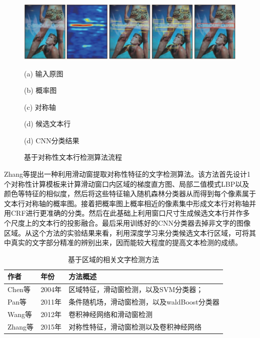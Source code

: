     \begin{figure}[!h]
    \centering
    \includegraphics[width=\textwidth]{./figures/c2_zhang_cnn.jpg}
    \begin{minipage}[t]{0.18\linewidth}
    \centerline{ \small (a) 输入原图}
    \end{minipage}
    \begin{minipage}[t]{0.18\linewidth}
    \centerline{ \small (b) 概率图}
    \end{minipage}
    \begin{minipage}[t]{0.18\linewidth}
    \centerline{ \small (c) 对称轴}
    \end{minipage}
    \begin{minipage}[t]{0.18\linewidth}
    \centerline{ \small (d) 候选文本行}
    \end{minipage}
    \begin{minipage}[t]{0.18\linewidth}
    \centerline{ \small (d) CNN分类结果}
    \end{minipage}
    \caption{基于对称性文本行检测算法流程}
    \label{fig.c2_zhang_cnn}
    \end{figure}

    Zhang等\cite{Zhang2015Symmetry}提出一种利用滑动窗提取对称性特征的文字检测算法。该方法首先设计1个对称性计算模板来计算滑动窗口内区域的梯度直方图、局部二值模式LBP以及颜色等特征的相似度，然后将这些特征输入随机森林分类器从而得到每个像素属于文本行对称轴的概率图。接着把概率图上概率相近的像素集中形成文本行对称轴并用CRF进行更准确的分类。然后在此基础上利用窗口尺寸生成候选文本行并作多个尺度上的文本行的投影融合。最后采用训练好的CNN分类器去掉非文字的图像区域。从这个方法的实验结果来看，利用深度学习来分类候选文本行区域，可将其中真实的文字部分精准的辨别出来，因而能较大程度的提高文本检测的成绩。

    \begin{table}[!h]
    \centering
    \caption{基于区域的相关文字检测方法}
    \begin{tabular}{p{}|p{}| p{}}
    \hline
    作者 & 年份 & 方法概述 \\
    \hline
    Chen等\cite{Chen2004Detecting} & 2004年 & 区域特征，滑动窗检测，以及SVM分类器；\\
    Pan等\cite{Pan2011A} & 2011年 &   条件随机场，滑动窗检测，以及waldBoost分类器\\
    Wang等\cite{Wang2012End} & 2012年 & 卷积神经网络和滑动窗检测 \\
    Zhang等\cite{Zhang2015Symmetry} & 2015年 & 对称性特征，滑动窗检测以及卷积神经网络 \\
    \hline
    \end{tabular}
    \label{tab.c2_region_based}
    \end{table}

